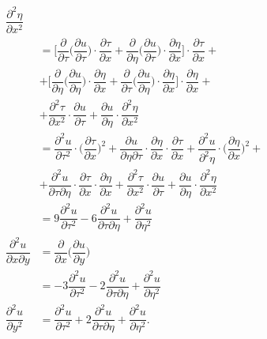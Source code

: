 \begin{align*}
                                   \dfrac{\partial^2 \eta}{\partial x^2} \\
                                 &= \Big[ \dfrac{\partial}{\partial \tau} \Big(\dfrac{\partial u}{\partial \tau}\Big) \cdot %
                                   \dfrac{\partial \tau}{\partial x} + \dfrac{\partial}{\partial \eta} \Big(\dfrac{\partial u}{\partial \tau}\Big) \cdot %
                                   \dfrac{\partial \eta}{\partial x} \Big] \cdot \dfrac{\partial \tau}{\partial x} + \\
                                 &+ \Big[ \dfrac{\partial}{\partial \eta} \Big(\dfrac{\partial u}{\partial \eta}\Big) \cdot %
                                   \dfrac{\partial \eta}{\partial x} + \dfrac{\partial}{\partial \tau} \Big(\dfrac{\partial u}{\partial \eta}\Big) \cdot %
                                   \dfrac{\partial \eta}{\partial x} \Big] \cdot \dfrac{\partial \eta}{\partial x} + \\
                                 &+ \dfrac{\partial^2 \tau}{\partial x^2} \cdot \dfrac{\partial u}{\partial \tau} + %
                                   \dfrac{\partial u}{\partial \eta} \cdot \dfrac{\partial^2 \eta}{\partial x^2} \\
                                 &= \dfrac{\partial^2 u}{\partial \tau^2} \cdot \Big( \dfrac{\partial \tau}{\partial x} \Big)^2 + %
                                   \dfrac{\partial u}{\partial \eta \partial \tau} \cdot \dfrac{\partial \eta}{\partial x} \cdot \dfrac{\partial \tau}{\partial x} + %
                                   \dfrac{\partial^2 u}{\partial^2 \eta} \cdot \Big( \dfrac{\partial \eta}{\partial x} \Big)^2 + \\
                                 &+ \dfrac{\partial^2 u}{\partial \tau\partial \eta} \cdot \dfrac{\partial \tau}{\partial x} \cdot \dfrac{\partial \eta}{\partial x} + %
                                   \dfrac{\partial^2 \tau}{\partial x^2} \cdot \dfrac{\partial u}{\partial \tau} + \dfrac{\partial u}{\partial \eta} \cdot %
                                   \dfrac{\partial^2 \eta}{\partial x^2} \\
                                 &= 9 \dfrac{\partial^2 u}{\partial \tau^2} - %
                                   6 \dfrac{\partial^2 u}{\partial \tau \partial \eta} + %
                                   \dfrac{\partial^2 u}{\partial \eta^2} \\
  \dfrac{\partial^2 u}{\partial x \partial y} &= \dfrac{\partial}{\partial x}\Big( \dfrac{\partial u}{\partial y} \Big)\\
                                 &= -3\dfrac{\partial^2 u}{\partial \tau^2} - %
                                   2 \dfrac{\partial ^2 u}{\partial \tau \partial \eta} + %
                                   \dfrac{\partial^2 u}{\partial \eta^2} \\
  \dfrac{\partial^2 u}{\partial y^2} &= \dfrac{\partial^2 u}{\partial \tau^2} + %
                                       2 \dfrac{\partial^2 u}{\partial \tau \partial \eta} + %
                                       \dfrac{\partial^2 u}{\partial \eta^2}.  
\end{align*}

